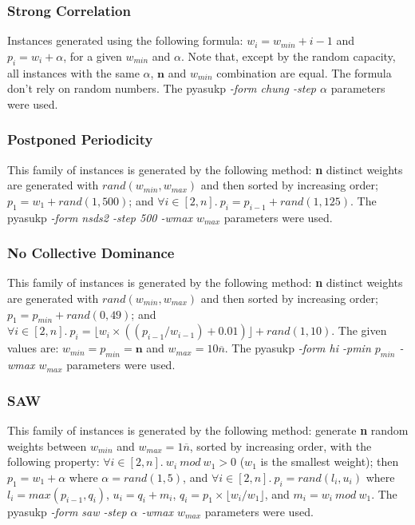 \documentclass[runningheads,a4paper]{llncs}
\begin{document}
\subsubsection{Strong Correlation}
Instances generated using the following formula: \(w_i = w_{min} + i - 1\) and \(p_i = w_i + \alpha\), for a given \(w_{min}\) and \(\alpha\).  Note that, except by the random capacity, all instances with the same \(\alpha\), \(\mathbf{n}\) and \(w_{min}\) combination are equal. The formula don't rely on random numbers. The pyasukp \emph{-form chung -step \(\alpha\) } parameters were used.

\subsubsection{Postponed Periodicity}
This family of instances is generated by the following method: \textbf{n} distinct weights are generated with \(rand(w_{min}, w_{max})\) and then sorted by increasing order; \(p_1 = w_1 + rand(1, 500)\); and \(\forall i \in [2, n].~p_i = p_{i-1} + rand(1, 125)\). The pyasukp \emph{-form nsds2 -step 500 -wmax \(w_{max}\)} parameters were used.

\subsubsection{No Collective Dominance}
This family of instances is generated by the following method: \textbf{n} distinct weights are generated with \(rand(w_{min}, w_{max})\) and then sorted by increasing order; \(p_1 = p_{min} + rand(0, 49)\); and \(\forall i \in [2, n].~p_i = \lfloor w_i \times ((p_{i-1}/w_{i-1}) + 0.01)\rfloor + rand(1, 10)\). The given values are: \(w_{min} = p_{min} = \mathbf{n}\) and \(w_{max} = 10\overline{n}\). The pyasukp \emph{-form hi -pmin \(p_{min}\) -wmax \(w_{max}\)} parameters were used.

\subsubsection{SAW}
This family of instances is generated by the following method: generate \textbf{n} random weights between \(w_{min}\) and \(w_{max} = 1\overline{n}\), sorted by increasing order, with the following property: \(\forall i \in [2, n].~w_i~mod~w_1 > 0\) (\(w_1\) is the smallest weight); then \(p_1 = w_1 + \alpha\) where \(\alpha = rand(1,5)\), and \(\forall i \in [2, n].~p_i = rand(l_i, u_i)\) where \(l_i = max(p_{i-1}, q_i)\), \(u_i = q_i + m_i\), \(q_i = p_1 \times \lfloor w_i / w_1 \rfloor \), and \(m_i = w_i~mod~w_1\). The pyasukp \emph{-form saw -step \(\alpha\) -wmax \(w_{max}\)} parameters were used.
\end{document}
